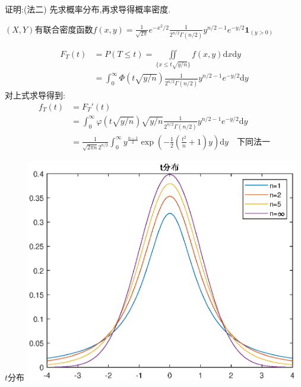 	\begin{frame}
		证明:(法二) 先求概率分布,再求导得概率密度.
		
		$(X,Y)$有联合密度函数$f(x,y) = \frac{1}{\sqrt{2\pi}}e^{-x^2/2} \frac{1}{2^{n/2}\Gamma(n/2)}y^{n/2-1}e^{-y/2}\bm{1}_{(y>0)}$
		
		
		\begin{equation}
			\begin{split}
				F_T(t) &= P(T\leqslant t) = \iint\limits_{\{x\leqslant t\sqrt{y/n}\}}f(x,y)\mathrm{d}x\mathrm{d}y \\
				&= \int_{0}^{\infty}\varPhi(t\sqrt{y/n})\frac{1}{2^{n/2}\Gamma(n/2)}y^{n/2-1}e^{-y/2} \mathrm{d}y
			\end{split}
		\end{equation}
		对上式求导得到:
		\begin{equation}
			\begin{split}
				f_T(t) &= F_T'(t) \\
				&= \int_{0}^{\infty}\varphi(t\sqrt{y/n})\sqrt{y/n}\frac{1}{2^{n/2}\Gamma(n/2)}y^{n/2-1}e^{-y/2} \mathrm{d}y \\
				&=\frac{1}{\sqrt{2\pi n}2^{n/2}} \int_{0}^{\infty} y^{\frac{n-1}{2}}\exp(-\frac{1}{2}(\frac{t^2}{n}+1)y) \mathrm{d}y \quad\text{下同法一}
			\end{split}
		\end{equation}
	\end{frame}



	\begin{frame}{$t$分布}
		\centering
		\includegraphics[width = 0.9\textwidth]{images/student(t).eps}
	\end{frame}

